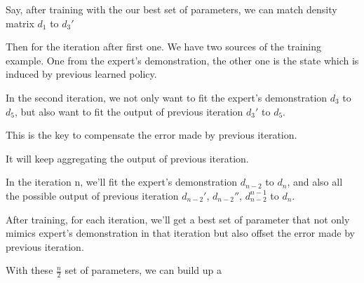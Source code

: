 \documentclass[twoside]{article}
\begin{document}

Say, after training with the our best set of parameters, we can match density matrix $d_1$ to $d_{3}'$

Then for the iteration after first one.
We have two sources of the training example. One from the expert's demonstration, the other one is the state which is induced by previous learned policy.

In the second iteration,  we not only want to fit the expert's demonstration $d_3$ to $d_5$, but also want to fit the output of previous iteration $d_{3}'$ to $d_5$.

This is the key to compensate the error made by previous iteration.

It will keep aggregating the output of previous iteration.

In the iteration n,  we'll fit the expert's demonstration $d_{n-2}$ to $d_n$, and also all the possible output of previous iteration $d_{n-2}'$,  $d_{n-2}''$,  $d_{n-2}^{n-1}$  to $d_n$.


After training, for each iteration, we'll get a best set of parameter that not only mimics expert's demonstration in that iteration but also offset the error made by previous iteration.

With these $\frac{n}{2}$ set of parameters, we can build up a 
\end{document}
